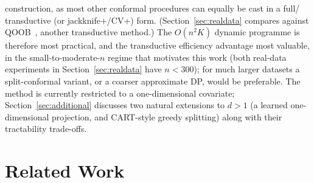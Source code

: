 \documentclass[11pt]{article}
\begin{document}
construction, as most other conformal procedures can equally be cast in a full/
transductive (or jackknife+/CV+) form. (Section~\ref{sec:realdata} compares against QOOB~\citep{GuptaEtAl2022},
another transductive method.)
The $O(n^2K)$ dynamic programme is therefore most practical, and the transductive
efficiency advantage most valuable, in the small-to-moderate-$n$ regime that motivates
this work (both real-data experiments in Section~\ref{sec:realdata} have $n<300$); for
much larger datasets a split-conformal variant, or a coarser approximate DP, would be
preferable.
The method is currently restricted to a one-dimensional covariate; Section~\ref{sec:additional}
discusses two natural extensions to $d>1$ (a learned one-dimensional projection, and
CART-style greedy splitting) along with their tractability trade-offs.


\section{Related Work}
\label{sec:related}
\end{document}
